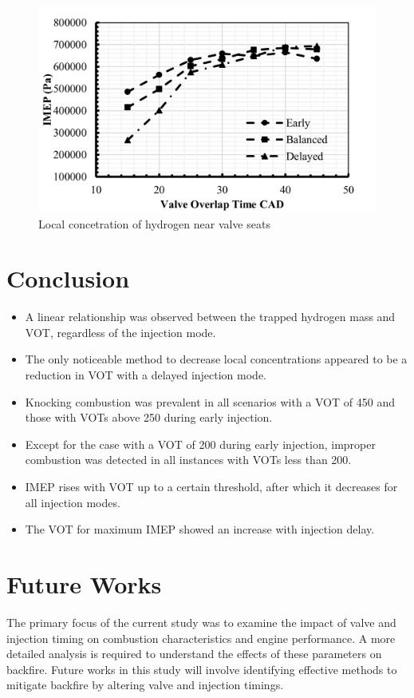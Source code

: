 \documentclass[conference]{IEEEtran}
\begin{document}
\begin{figure}[htbp]
    \centerline{\includegraphics{plots and graphs/11.png}}
    \caption{Local concetration of hydrogen near valve seats}
    \label{plt_11}
    \end{figure}

\section{Conclusion}
\begin{itemize}
    \item A linear relationship was observed between the trapped hydrogen mass and VOT, regardless of the injection mode.
    \item The only noticeable method to decrease local concentrations appeared to be a reduction in VOT with a delayed injection mode.
    \item Knocking combustion was prevalent in all scenarios with a VOT of 450 and those with VOTs above 250 during early injection.
    \item Except for the case with a VOT of 200 during early injection, improper combustion was detected in all instances with VOTs less than 200. 
    \item IMEP rises with VOT up to a certain threshold, after which it decreases for all injection modes.
    \item The VOT for maximum IMEP showed an increase with injection delay.
\end{itemize}

\section{Future Works}
The primary focus of the current study was to examine the impact of valve and injection timing on combustion characteristics and engine performance. A more detailed analysis is required to understand the effects of these parameters on backfire. Future works in this study will involve identifying effective methods to mitigate backfire by altering valve and injection timings.
\end{document}
